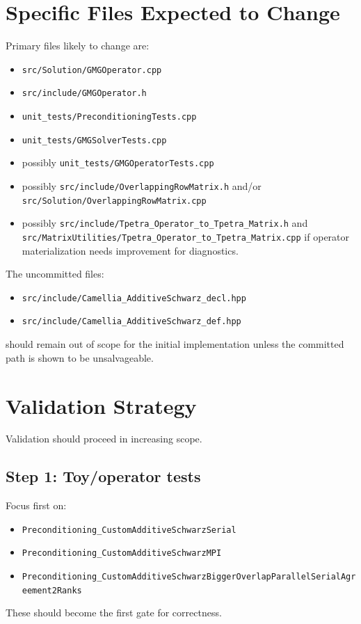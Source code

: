 \documentclass[11pt]{article}
\begin{document}
\section{Specific Files Expected to Change}
Primary files likely to change are:
\begin{itemize}
  \item \texttt{src/Solution/GMGOperator.cpp}
  \item \texttt{src/include/GMGOperator.h}
  \item \texttt{unit\_tests/PreconditioningTests.cpp}
  \item \texttt{unit\_tests/GMGSolverTests.cpp}
  \item possibly \texttt{unit\_tests/GMGOperatorTests.cpp}
  \item possibly \texttt{src/include/OverlappingRowMatrix.h} and/or \texttt{src/Solution/OverlappingRowMatrix.cpp}
  \item possibly \texttt{src/include/Tpetra\_Operator\_to\_Tpetra\_Matrix.h} and \texttt{src/MatrixUtilities/Tpetra\_Operator\_to\_Tpetra\_Matrix.cpp} if operator materialization needs improvement for diagnostics.
\end{itemize}

The uncommitted files:
\begin{itemize}
  \item \texttt{src/include/Camellia\_AdditiveSchwarz\_decl.hpp}
  \item \texttt{src/include/Camellia\_AdditiveSchwarz\_def.hpp}
\end{itemize}
should remain out of scope for the initial implementation unless the committed path is shown to be unsalvageable.

\section{Validation Strategy}
Validation should proceed in increasing scope.

\subsection{Step 1: Toy/operator tests}
Focus first on:
\begin{itemize}
  \item \texttt{Preconditioning\_CustomAdditiveSchwarzSerial}
  \item \texttt{Preconditioning\_CustomAdditiveSchwarzMPI}
  \item \texttt{Preconditioning\_CustomAdditiveSchwarzBiggerOverlapParallelSerialAgreement2Ranks}
\end{itemize}
These should become the first gate for correctness.
\end{document}
